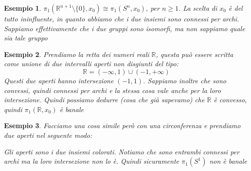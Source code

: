 \documentclass[11pt,a4paper,twoside]{article}
\newtheorem{es}{Esempio}
\theoremstyle{definition}
\begin{document}
\begin{es}
	$\pi_1(\mathbb R^{n+1} \setminus \{0\}, x_0)\cong \pi_1(S^n, x_0)$, per $n\geq 1$. La scelta di $x_0$ è del tutto ininfluente, in quanto abbiamo che i due insiemi sono connessi per archi. Sappiamo effettivamente che i due gruppi sono isomorfi, ma non sappiamo quale sia tale gruppo
\end{es}

\begin{es}
	Prendiamo la retta dei numeri reali $\mathbb R$, questa può essere scritta come unione di due intervalli aperti non disgiunti del tipo:
	\[ \mathbb R = (-\infty, 1)\cup (-1, + \infty) \]
	Questi due aperti hanno intersezione $(-1,1)$. Sappiamo inoltre che sono convessi, quindi connessi per archi e la stessa cosa vale anche per la loro intersezione. Quindi possiamo dedurre (cosa che già sapevamo) che $\mathbb R$ è convesso, quindi $\pi_1(\mathbb R, x_0)$ è banale
\end{es}

\begin{es}
	Facciamo una cosa simile però con una circonferenza e prendiamo due aperti nel seguente modo:
	\begin{center}
	\end{center}
	Gli aperti sono i due insiemi colorati. Notiamo che sono entrambi connessi per archi ma la loro intersezione non lo è. Quindi sicuramente $\pi_1(S^1)$ non è banale
\end{es}
\end{document}
